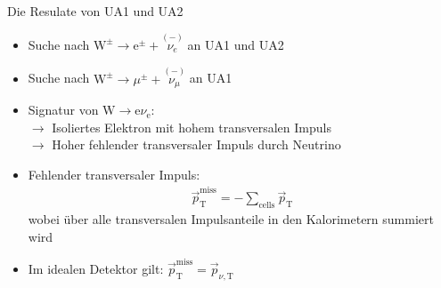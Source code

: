 \documentclass[aspectratio=1610, professionalfonts, 10pt]{beamer}
\begin{document}
\begin{frame}{Die Resulate von UA1 und UA2}
			\begin{itemize}
				\setlength\itemsep{0.5em}
				\item Suche nach $\text{W}^{\pm} \rightarrow \text{e}^{\pm} + \overset{(-)}{\nu_e}$ an UA1 und UA2
				\item Suche nach $\text{W}^{\pm} \rightarrow \mu^{\pm} + \overset{(-)}{\nu_\mu}$ an UA1
				\item Signatur von $\text{W} \rightarrow \text{e} \nu_\text{e}$:\\
				$\rightarrow$ Isoliertes Elektron mit hohem transversalen Impuls \\
				$\rightarrow$ Hoher fehlender transversaler Impuls durch Neutrino
				\item Fehlender transversaler Impuls:
				\begin{align*}
					\vec{p}_\text{T}^\text{miss} = - \sum_{\text{cells}} \vec{p}_\text{T}
				\end{align*}
				wobei über alle transversalen Impulsanteile in den Kalorimetern summiert wird
				\item Im idealen Detektor gilt: $\vec{p}_\text{T}^\text{miss} = \vec{p}_{\nu, \text{T}}$
			\end{itemize}

\end{frame}
\end{document}
